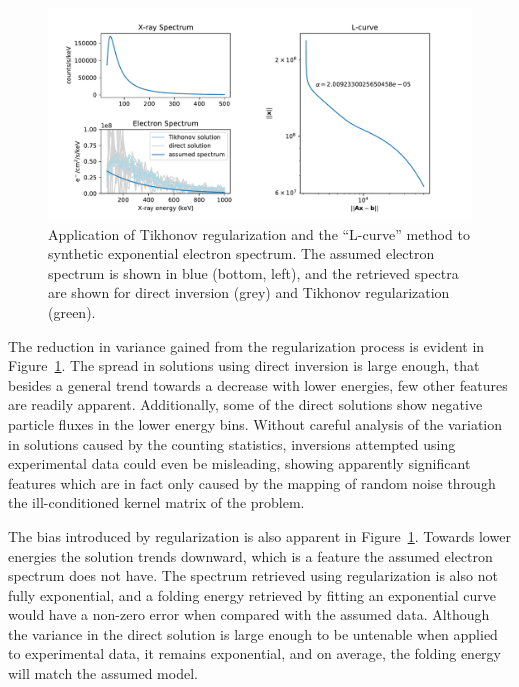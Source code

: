 \begin{figure}[h]
    \centering
    \includegraphics[width=1.1\textwidth]{figures/figure_8.pdf}
    \caption{Application of Tikhonov regularization and the ``L-curve'' method to synthetic exponential electron spectrum. The assumed electron spectrum is shown in blue (bottom, left), and the retrieved spectra are shown for direct inversion (grey) and Tikhonov regularization (green).  }
    \label{l-curve-example}
\end{figure}

The reduction in variance gained from the regularization process is evident in Figure~\ref{l-curve-example}. The spread in solutions using direct inversion is large enough, that besides a general trend towards a decrease with lower energies, few other features are readily apparent. Additionally, some of the direct solutions show negative particle fluxes in the lower energy bins. Without careful analysis of the variation in solutions caused by the counting statistics, inversions attempted using experimental data could even be misleading, showing apparently significant features which are in fact only caused by the mapping of random noise through the ill-conditioned kernel matrix of the problem. 

The bias introduced by regularization is also apparent in Figure~\ref{l-curve-example}. Towards lower energies the solution trends downward, which is a feature the assumed electron spectrum does not have. The spectrum retrieved using regularization is also not fully exponential, and a folding energy retrieved by fitting an exponential curve would have a non-zero error when compared with the assumed data. Although the variance in the direct solution is large enough to be untenable when applied to experimental data, it remains exponential, and on average, the folding energy will match the assumed model. 


